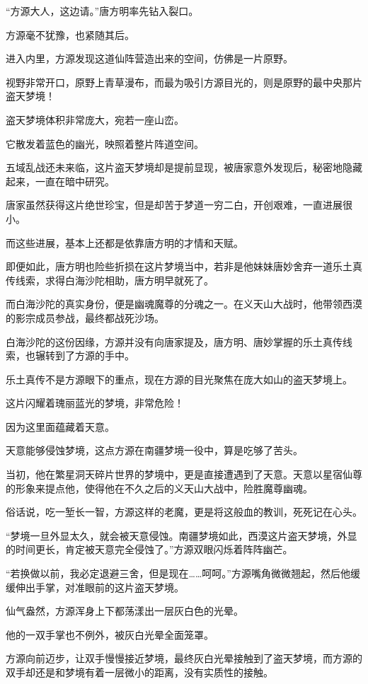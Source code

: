 \begin{this_body}
“方源大人，这边请。”唐方明率先钻入裂口。

方源毫不犹豫，也紧随其后。

进入内里，方源发现这道仙阵营造出来的空间，仿佛是一片原野。

视野非常开口，原野上青草漫布，而最为吸引方源目光的，则是原野的最中央那片盗天梦境！

盗天梦境体积非常庞大，宛若一座山峦。

它散发着蓝色的幽光，映照着整片阵道空间。

五域乱战还未来临，这片盗天梦境却是提前显现，被唐家意外发现后，秘密地隐藏起来，一直在暗中研究。

唐家虽然获得这片绝世珍宝，但是却苦于梦道一穷二白，开创艰难，一直进展很小。

而这些进展，基本上还都是依靠唐方明的才情和天赋。

即便如此，唐方明也险些折损在这片梦境当中，若非是他妹妹唐妙舍弃一道乐土真传线索，求得白海沙陀相助，唐方明早就死了。

而白海沙陀的真实身份，便是幽魂魔尊的分魂之一。在义天山大战时，他带领西漠的影宗成员参战，最终都战死沙场。

白海沙陀的这份因缘，方源并没有向唐家提及，唐方明、唐妙掌握的乐土真传线索，也辗转到了方源的手中。

乐土真传不是方源眼下的重点，现在方源的目光聚焦在庞大如山的盗天梦境上。

这片闪耀着瑰丽蓝光的梦境，非常危险！

因为这里面蕴藏着天意。

天意能够侵蚀梦境，这点方源在南疆梦境一役中，算是吃够了苦头。

当初，他在繁星洞天碎片世界的梦境中，更是直接遭遇到了天意。天意以星宿仙尊的形象来提点他，使得他在不久之后的义天山大战中，险胜魔尊幽魂。

俗话说，吃一堑长一智，方源这样的老魔，更是将这般血的教训，死死记在心头。

“梦境一旦外显太久，就会被天意侵蚀。南疆梦境如此，西漠这片盗天梦境，外显的时间更长，肯定被天意完全侵蚀了。”方源双眼闪烁着阵阵幽芒。

“若换做以前，我必定退避三舍，但是现在……呵呵。”方源嘴角微微翘起，然后他缓缓伸出手掌，对准眼前的这片盗天梦境。

仙气盎然，方源浑身上下都荡漾出一层灰白色的光晕。

他的一双手掌也不例外，被灰白光晕全面笼罩。

方源向前迈步，让双手慢慢接近梦境，最终灰白光晕接触到了盗天梦境，而方源的双手却还是和梦境有着一层微小的距离，没有实质性的接触。


\end{this_body}
